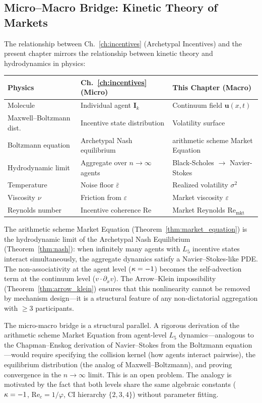 \subsection{Micro--Macro Bridge: Kinetic Theory of Markets}

The relationship between Ch.~\ref{ch:incentives} (Archetypal Incentives) and the present chapter mirrors the relationship between kinetic theory and hydrodynamics in physics:

\begin{center}
\begin{tabular}{@{}lll@{}}
\toprule
\textbf{Physics} & \textbf{Ch.~\ref{ch:incentives} (Micro)} & \textbf{This Chapter (Macro)} \\
\midrule
Molecule & Individual agent $\mathbf{I}_k$ & Continuum field $\mathbf{u}(x,t)$ \\
Maxwell--Boltzmann dist. & Incentive state distribution & Volatility surface \\
Boltzmann equation & Archetypal Nash equilibrium & arithmetic scheme Market Equation \\
Hydrodynamic limit & Aggregate over $n \to \infty$ agents & Black-Scholes $\to$ Navier-Stokes \\
Temperature & Noise floor $\bar\varepsilon$ & Realized volatility $\sigma^2$ \\
Viscosity $\nu$ & Friction from $\varepsilon$ & Market viscosity $\varepsilon$ \\
Reynolds number & Incentive coherence $\mathrm{Re}$ & Market Reynolds $\mathrm{Re}_{\mathrm{mkt}}$ \\
\bottomrule
\end{tabular}
\end{center}

The arithmetic scheme Market Equation (Theorem~\ref{thm:market_equation}) is the hydrodynamic limit of the Archetypal Nash Equilibrium (Theorem~\ref{thm:nash}): when infinitely many agents with $L_5$ incentive states interact simultaneously, the aggregate dynamics satisfy a Navier--Stokes-like PDE. The non-associativity at the agent level ($\kappa = -1$) becomes the self-advection term at the continuum level ($v \cdot \partial_x v$). The Arrow--Klein impossibility (Theorem~\ref{thm:arrow_klein}) ensures that this nonlinearity cannot be removed by mechanism design---it is a structural feature of any non-dictatorial aggregation with $\geq 3$ participants.

\begin{remark}
The micro-macro bridge is a structural parallel. A rigorous derivation of the arithmetic scheme Market Equation from agent-level $L_5$ dynamics---analogous to the Chapman--Enskog derivation of Navier--Stokes from the Boltzmann equation---would require specifying the collision kernel (how agents interact pairwise), the equilibrium distribution (the analog of Maxwell--Boltzmann), and proving convergence in the $n \to \infty$ limit. This is an open problem. The analogy is motivated by the fact that both levels share the same algebraic constants ($\kappa = -1$, $\mathrm{Re}_c = 1/\varphi$, CI hierarchy $\{2,3,4\}$) without parameter fitting.
\end{remark}

